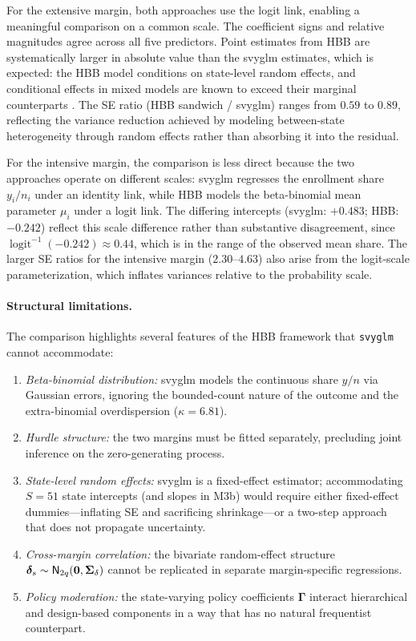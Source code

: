 For the extensive margin, both approaches use the logit link, enabling
a meaningful comparison on a common scale.  The coefficient signs and
relative magnitudes agree across all five predictors.  Point estimates
from HBB are systematically larger in absolute value than the svyglm
estimates, which is expected: the HBB model conditions on state-level
random effects, and conditional effects in mixed models are known to
exceed their marginal counterparts
\citep{ZegerLiangAlbert1988}.  The SE ratio
(HBB sandwich / svyglm) ranges from $0.59$ to $0.89$, reflecting the
variance reduction achieved by modeling between-state heterogeneity
through random effects rather than absorbing it into the residual.

For the intensive margin, the comparison is less direct because the two
approaches operate on different scales: svyglm regresses the
enrollment share $y_i / n_i$ under an identity link, while HBB models
the beta-binomial mean parameter $\mu_i$ under a logit link.  The
differing intercepts (svyglm: $+0.483$; HBB: $-0.242$) reflect this
scale difference rather than substantive disagreement, since
$\operatorname{logit}^{-1}(-0.242) \approx 0.44$, which is in the
range of the observed mean share.  The larger SE ratios for the
intensive margin ($2.30$--$4.63$) also arise from the logit-scale
parameterization, which inflates variances relative to the probability
scale.

\paragraph{Structural limitations.}
The comparison highlights several features of the HBB framework
that \texttt{svyglm} cannot accommodate:
\begin{enumerate}[nosep]
  \item \emph{Beta-binomial distribution:} svyglm models the continuous
    share $y/n$ via Gaussian errors, ignoring the bounded-count nature of
    the outcome and the extra-binomial overdispersion ($\kappa = 6.81$).
  \item \emph{Hurdle structure:} the two margins must be fitted
    separately, precluding joint inference on the zero-generating process.
  \item \emph{State-level random effects:} svyglm is a fixed-effect
    estimator; accommodating $S = 51$ state intercepts (and slopes in M3b)
    would require either fixed-effect dummies---inflating SE and
    sacrificing shrinkage---or a two-step approach that does not
    propagate uncertainty.
  \item \emph{Cross-margin correlation:} the bivariate random-effect
    structure $\boldsymbol{\delta}_s \sim \textsf{N}_{2q}(\mathbf{0},
    \boldsymbol{\Sigma}_\delta)$ cannot be replicated in separate
    margin-specific regressions.
  \item \emph{Policy moderation:} the state-varying policy coefficients
    $\boldsymbol{\Gamma}$ interact hierarchical and design-based
    components in a way that has no natural frequentist counterpart.
\end{enumerate}

